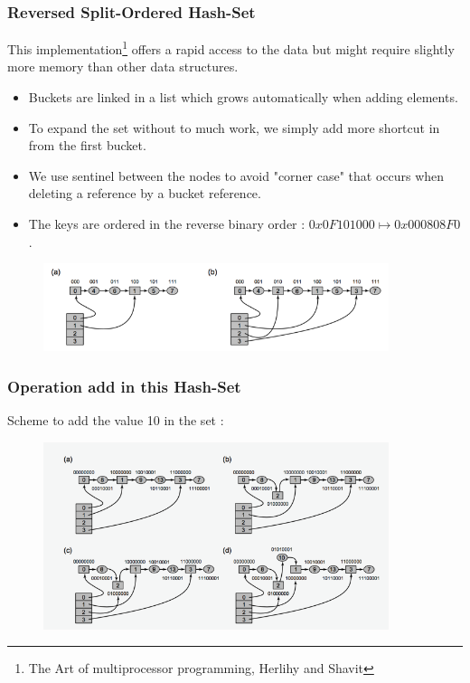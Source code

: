 \documentclass{bredelebeamer}
\begin{document}
\begin{frame}
  \frametitle{Reversed Split-Ordered Hash-Set}
  
  This implementation\footnote{The Art of multiprocessor programming, Herlihy
    and Shavit} offers a rapid access to the data but might require
  slightly more memory than other data structures.
  
  \begin{itemize}
  \item Buckets are linked in a list which grows automatically when adding
    elements.
  \item To expand the set without to much work, we simply add more shortcut in
    from the first bucket.
  \item We use sentinel between the nodes to avoid "corner case" that occurs
    when deleting a reference by a bucket reference.
  \item The keys are ordered in the reverse binary order : $0x0F101000 \mapsto 0x000808F0$.
  \end{itemize}
  
  \begin{figure}
    \centering
    \includegraphics[width=0.9\textwidth]{../report/images/hashsetFig1.png}
  \end{figure}
\end{frame}

\begin{frame}
  \frametitle{Operation add in this Hash-Set}
  Scheme to add the value 10 in the set :
  \begin{figure}
    \centering
    \includegraphics[width=0.9\textwidth]{../report/images/hashsetFig2.png}
  \end{figure}
\end{frame}
\end{document}
